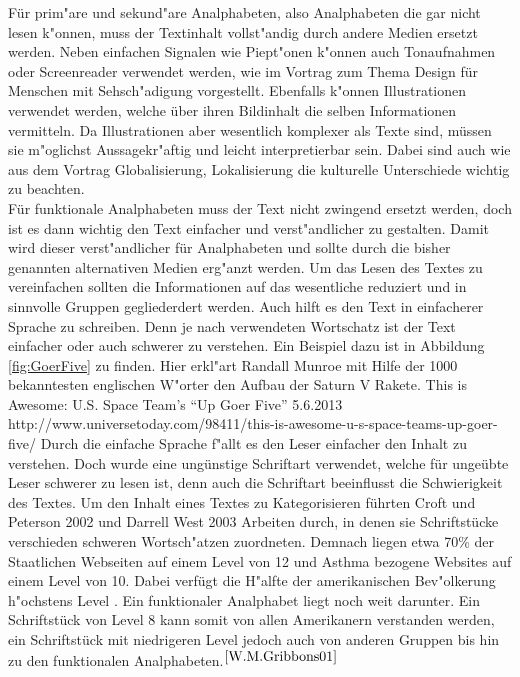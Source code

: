 Für prim"are und sekund"are Analphabeten, also Analphabeten die gar nicht lesen k"onnen, muss der Textinhalt vollst"andig durch andere Medien ersetzt werden. Neben einfachen Signalen wie Piept"onen k"onnen auch Tonaufnahmen oder Screenreader verwendet werden, wie im Vortrag zum Thema  \glqq Design für Menschen mit Sehsch"adigung \grqq vorgestellt.
Ebenfalls k"onnen Illustrationen verwendet werden, welche über ihren Bildinhalt die selben Informationen vermitteln.
Da Illustrationen aber wesentlich komplexer als Texte sind, müssen sie m"oglichst Aussagekr"aftig und leicht interpretierbar sein. Dabei sind auch wie aus dem Vortrag \glqq Globalisierung, Lokalisierung \grqq die kulturelle Unterschiede wichtig zu beachten.\\
Für funktionale Analphabeten muss der Text nicht zwingend ersetzt werden, doch ist es dann wichtig den Text einfacher und verst"andlicher zu gestalten. Damit wird dieser verst"andlicher für Analphabeten und sollte durch die bisher genannten alternativen Medien erg"anzt werden. Um das Lesen des Textes zu vereinfachen sollten die Informationen auf das wesentliche reduziert und in sinnvolle Gruppen gegliederdert werden. Auch hilft es den Text in einfacherer Sprache zu schreiben. Denn je nach verwendeten Wortschatz ist der Text einfacher oder auch schwerer zu verstehen. Ein Beispiel dazu ist in Abbildung \ref{fig:GoerFive} zu finden. Hier erkl"art Randall Munroe mit Hilfe der 1000 bekanntesten englischen W"orter den Aufbau der Saturn V Rakete.
				{This is Awesome: U.S. Space Team’s “Up Goer Five”}
				{5.6.2013}
				{http://www.universetoday.com/98411/this-is-awesome-u-s-space-teams-up-goer-five/}
 Durch die einfache Sprache f"allt es den Leser einfacher den Inhalt zu verstehen. Doch wurde eine ungünstige Schriftart verwendet, welche für ungeübte Leser schwerer zu lesen ist, denn auch die Schriftart beeinflusst die Schwierigkeit des Textes.
Um den Inhalt eines Textes zu Kategorisieren führten Croft und Peterson 2002 und Darrell West 2003 Arbeiten durch, in denen sie Schriftstücke verschieden schweren Wortsch"atzen zuordneten.
Demnach liegen etwa 70\% der Staatlichen Webseiten auf einem Level von 12 und Asthma bezogene Websites auf einem Level von 10.
Dabei verfügt die H"alfte der amerikanischen Bev"olkerung h"ochstens Level . Ein funktionaler Analphabet liegt noch weit darunter.
Ein Schriftstück von Level 8 kann somit von allen Amerikanern verstanden werden, ein Schriftstück mit niedrigeren Level jedoch auch von anderen Gruppen bis hin zu den funktionalen Analphabeten.$^{\ref{W.M.Gribbons01}}$\\

